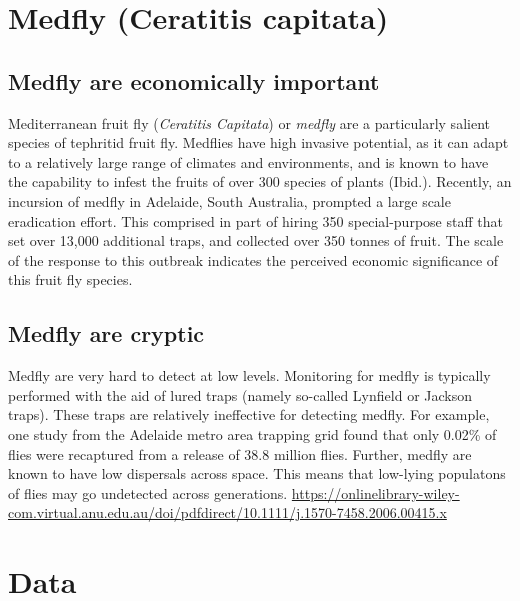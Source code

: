 \documentclass[
  oneside]{book}
\begin{document}
\hypertarget{medfly-ceratitis-capitata}{%
\section{Medfly (Ceratitis capitata)}\label{medfly-ceratitis-capitata}}

\hypertarget{medfly-are-economically-important}{%
\subsection{Medfly are economically important}\label{medfly-are-economically-important}}

Mediterranean fruit fly (\emph{Ceratitis Capitata}) or \emph{medfly} are a particularly salient species of tephritid fruit fly. Medflies have high invasive potential, as it can adapt to a relatively large range of climates and environments, and is known to have the capability to infest the fruits of over 300 species of plants (Ibid.). Recently, an incursion of medfly in Adelaide, South Australia, prompted a large scale eradication effort. This comprised in part of hiring 350 special-purpose staff that set over 13,000 additional traps, and collected over 350 tonnes of fruit. The scale of the response to this outbreak indicates the perceived economic significance of this fruit fly species.

\hypertarget{medfly-are-cryptic}{%
\subsection{Medfly are cryptic}\label{medfly-are-cryptic}}

Medfly are very hard to detect at low levels. Monitoring for medfly is typically performed with the aid of lured traps (namely so-called Lynfield or Jackson traps). These traps are relatively ineffective for detecting medfly. For example, one study from the Adelaide metro area trapping grid found that only 0.02\% of flies were recaptured from a release of 38.8 million flies. Further, medfly are known to have low dispersals across space. This means that low-lying populatons of flies may go undetected across generations. \url{https://onlinelibrary-wiley-com.virtual.anu.edu.au/doi/pdfdirect/10.1111/j.1570-7458.2006.00415.x}

\hypertarget{data}{%
\section{Data}\label{data}}
\end{document}
